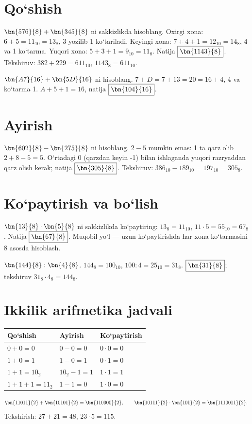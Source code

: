 \documentclass[11pt,a4paper,openany,oneside]{book}
\begin{document}
\section{Qo‘shish}
\begin{worked}
\(\bn{576}{8}+\bn{345}{8}\) ni sakkizlikda hisoblang. Oxirgi xona: \(6+5=11_{10}=13_8\), 3 yozilib 1 ko‘tariladi. Keyingi xona: \(7+4+1=12_{10}=14_8\), 4 va 1 ko‘tarma. Yuqori xona: \(5+3+1=9_{10}=11_8\). Natija \(\boxed{\bn{1143}{8}}\). Tekshiruv: \(382+229=611_{10}\), \(1143_8=611_{10}\).
\end{worked}
\begin{worked}
\(\bn{A7}{16}+\bn{5D}{16}\) ni hisoblang. \(7+D=7+13=20=16+4\), 4 va ko‘tarma 1. \(A+5+1=16\), natija \(\boxed{\bn{104}{16}}\).
\end{worked}
\section{Ayirish}
\begin{worked}
\(\bn{602}{8}-\bn{275}{8}\) ni hisoblang. \(2-5\) mumkin emas: 1 ta qarz olib \(2+8-5=5\). O‘rtadagi 0 (qarzdan keyin -1) bilan ishlaganda yuqori razryaddan qarz olish kerak; natija \(\boxed{\bn{305}{8}}\). Tekshiruv: \(386_{10}-189_{10}=197_{10}=305_8\).
\end{worked}
\section{Ko‘paytirish va bo‘lish}
\begin{worked}
\(\bn{13}{8}\cdot\bn{5}{8}\) ni sakkizlikda ko‘paytiring: \(13_8=11_{10}\), \(11\cdot5=55_{10}=67_8\). Natija \(\boxed{\bn{67}{8}}\). Muqobil yo‘l — uzun ko‘paytirishda har xona ko‘tarmasini 8 asosda hisoblash.
\end{worked}
\begin{worked}
\(\bn{144}{8}:\bn{4}{8}\). \(144_8=100_{10}\), \(100:4=25_{10}=31_8\). \(\boxed{\bn{31}{8}}\); tekshiruv \(31_8\cdot4_8=144_8\).
\end{worked}
\section{Ikkilik arifmetika jadvali}
\begin{center}\renewcommand{\arraystretch}{1.15}
\begin{tabular}{@{}l l l@{}}\toprule
Qo‘shish & Ayirish & Ko‘paytirish \\ \midrule
\(0+0=0\) & \(0-0=0\) & \(0\cdot0=0\) \\
\(1+0=1\) & \(1-0=1\) & \(0\cdot1=0\) \\
\(1+1=10_2\) & \(10_2-1=1\) & \(1\cdot1=1\) \\
\(1+1+1=11_2\) & \(1-1=0\) & \(1\cdot0=0\) \\
\bottomrule\end{tabular}\end{center}
\begin{worked}
\[\bn{11011}{2}+\bn{10101}{2}=\bn{110000}{2},\qquad
\bn{10111}{2}\cdot\bn{101}{2}=\bn{1110011}{2}.\]
Tekshirish: \(27+21=48\), \(23\cdot5=115\).
\end{worked}
\end{document}
